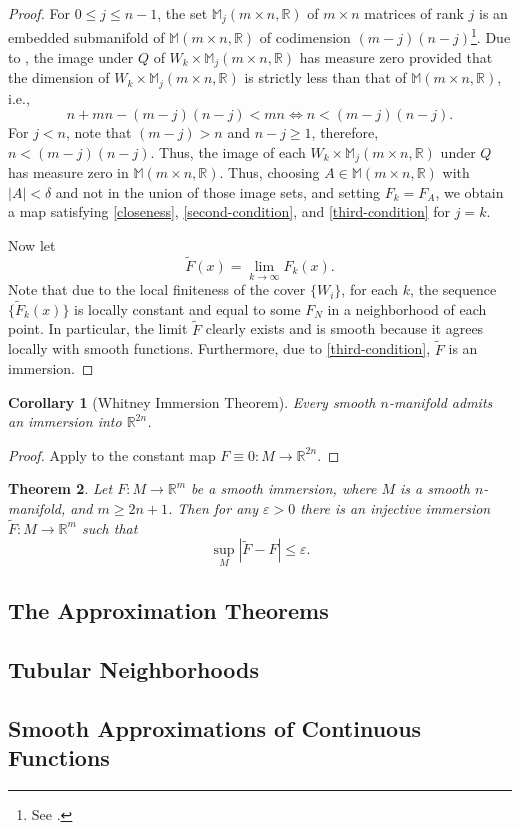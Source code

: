 \documentclass[11pt]{article}
\theoremstyle{thmstyle}
\newtheorem{theorem}{Theorem}[section]
\theoremstyle{defstyle}
\newtheorem{corollary}[theorem]{Corollary}
\newcommand{\R}{\mathbb{R}}
\newcommand{\wt}[1]{\widetilde{#1}}
\renewcommand{\le}{\leqslant}
\renewcommand{\ge}{\geqslant}
\begin{document}
\begin{proof}
	For $0\le j\le n - 1$, the set $\mathbb M_j(m\times n, \R)$ of $m\times n$ matrices of rank $j$ is an embedded submanifold of $\mathbb M(m\times n, \R)$ of codimension $(m - j)(n - j)$\footnote{See \cite[Example 8.14]{lee-smooth-manifolds}.}. Due to , the image under $Q$ of $W_k\times\mathbb M_j(m\times n, \R)$ has measure zero provided that the dimension of $W_k\times\mathbb M_j(m\times n, \R)$ is strictly less than that of $\mathbb M(m\times n, \R)$, i.e., 
	\begin{equation*}
		n + mn - (m - j)(n - j) < mn\iff n < (m - j)(n - j).
	\end{equation*}
	For $j < n$, note that $(m - j) > n$ and $n - j\ge 1$, therefore, $n < (m - j)(n - j)$. Thus, the image of each $W_k\times\mathbb M_j(m\times n, \R)$ under $Q$ has measure zero in $\mathbb M(m\times n, \R)$. Thus, choosing $A\in\mathbb M(m\times n, \R)$ with $|A| < \delta$ and not in the union of those image sets, and setting $F_k = F_A$, we obtain a map satisfying \ref{closeness}, \ref{second-condition}, and \ref{third-condition} for $j = k$.

	Now let 
	\begin{equation*}
		\wt F(x) = \lim_{k\to\infty} F_k(x).
	\end{equation*}
	Note that due to the local finiteness of the cover $\{W_i\}$, for each $k$, the sequence $\{\wt F_k(x)\}$ is locally constant and equal to some $F_N$ in a neighborhood of each point. In particular, the limit $\wt F$ clearly exists and is smooth because it agrees locally with smooth functions. Furthermore, due to \ref{third-condition}, $\wt F$ is an immersion.
\end{proof}

\begin{corollary}[Whitney Immersion Theorem]
	Every smooth $n$-manifold admits an immersion into $\R^{2n}$.
\end{corollary}
\begin{proof}
	Apply  to the constant map $F\equiv 0\colon M\to\R^{2n}$.
\end{proof}

\begin{theorem}
	Let $F\colon M\to\R^m$ be a smooth immersion, where $M$ is a smooth $n$-manifold, and $m\ge 2n + 1$. Then for any $\varepsilon > 0$ there is an injective immersion $\wt F\colon M\to\R^m$ such that 
	\begin{equation*}
		\sup_M |\wt F - F|\le\varepsilon.
	\end{equation*}
\end{theorem}


\subsection{The Approximation Theorems}

\subsection{Tubular Neighborhoods}

\subsection{Smooth Approximations of Continuous Functions}


\end{document}
